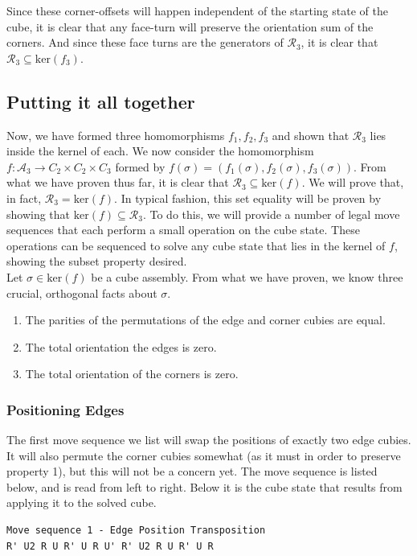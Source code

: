 \documentclass[10pt,letterpaper]{report}
\begin{document}
Since these corner-offsets will happen independent of the starting state of the cube, it is clear that any face-turn will preserve the orientation sum of the corners.  And since these face turns are the generators of $\mathcal{R}_3$, it is clear that $\mathcal{R}_3 \subseteq \text{ker}(f_3)$.

\subsection{Putting it all together}
Now, we have formed three homomorphisms $f_1,f_2,f_3$ and shown that $\mathcal{R}_3$ lies inside the kernel of each.  We now consider the homomorphism $f: \mathcal{A}_3 \rightarrow C_2 \times C_2 \times C_3$ formed by $f(\sigma) = (f_1(\sigma), f_2(\sigma), f_3(\sigma))$.  From what we have proven thus far, it is clear that $\mathcal{R}_3 \subseteq \text{ker}(f)$.  We will prove that, in fact, $\mathcal{R}_3 = \text{ker}(f)$.  In typical fashion, this set equality will be proven by showing that $\text{ker}(f) \subseteq \mathcal{R}_3$.  To do this, we will provide a number of legal move sequences that each perform a small operation on the cube state.  These operations can be sequenced to solve any cube state that lies in the kernel of $f$, showing the subset property desired. \\

Let $\sigma \in \text{ker}(f)$ be a cube assembly.  From what we have proven, we know three crucial, orthogonal facts about $\sigma$.  \begin{enumerate}
\item The parities of the permutations of the edge and corner cubies are equal.
\item The total orientation the edges is zero.
\item The total orientation of the corners is zero.
\end{enumerate}

\subsubsection{Positioning Edges}

The first move sequence we list will swap the positions of exactly two edge cubies.  It will also permute the corner cubies somewhat (as it must in order to preserve property 1), but this will not be a concern yet.  The move sequence is listed below, and is read from left to right.  Below it is the cube state that results from applying it to the solved cube.
\begin{verbatim}
Move sequence 1 - Edge Position Transposition
R' U2 R U R' U R U' R' U2 R U R' U R
\end{verbatim}
\end{document}
